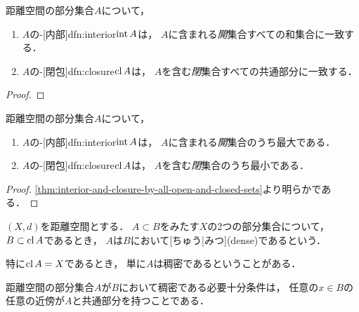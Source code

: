\documentclass[../sotsu.tex]{subfiles}
\begin{document}
\begin{proposition}
    \label{thm:interior-and-closure-by-all-open-and-closed-sets}
    距離空間の部分集合$A$について，
    \begin{enumerate}
        \item $A$の-[内部]{dfn:interior}$\operatorname{int}{A}$は，
            $A$に含まれる\emph{開}集合すべての和集合に一致する．
        \item $A$の-[閉包]{dfn:closure}$\operatorname{cl}{A}$は，
            $A$を含む\emph{閉}集合すべての共通部分に一致する．
    \end{enumerate}
\end{proposition}

\begin{proof}
    
\end{proof}


\begin{corollary}
    \label{thm:interior-or-closure-is-max-or-min}
    距離空間の部分集合$A$について，
    \begin{enumerate}
        \item $A$の-[内部]{dfn:interior}$\operatorname{int}{A}$は，
            $A$に含まれる\emph{開}集合のうち最大である．
        \item $A$の-[閉包]{dfn:closure}$\operatorname{cl}{A}$は，
            $A$を含む\emph{閉}集合のうち最小である．
    \end{enumerate}
\end{corollary}

\begin{proof}
    \cref{thm:interior-and-closure-by-all-open-and-closed-sets}より明らかである．
\end{proof}



\begin{definition}[稠密]
    \label{dfn:dense}
    $(X, d)$を距離空間とする．
    $A \subset B$をみたす$X$の2つの部分集合について，
    $B \subset \operatorname{cl}{A}$であるとき，
    $A$は$B$において[ちゅう|みつ](dense)であるという\cite{iwanami-functional}．

    特に$\operatorname{cl}{A} = X$であるとき，
    単に$A$は稠密であるということがある．
\end{definition}

\begin{proposition}
    距離空間の部分集合$A$が$B$において稠密である必要十分条件は，
    任意の$x \in B$の任意の近傍が$A$と共通部分を持つことである\cite{iwanami-functional}．
\end{proposition}
\end{document}
